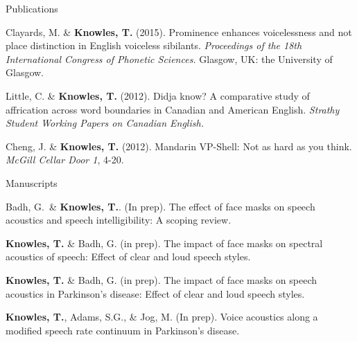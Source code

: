 \documentclass{resume} %
\begin{document}
\begin{rSection}{Publications}
\begin{etaremune}
	\item Clayards, M. \& {\bf Knowles, T.} (2015). Prominence enhances voicelessness and not place distinction in English voiceless sibilants. \emph{Proceedings of the 18th International Congress of Phonetic Sciences.} Glasgow, UK: the University of Glasgow.

	\item Little, C. \& {\bf Knowles, T.} (2012). Didja know? A comparative study of affrication across word boundaries in Canadian and American English. \emph{Strathy Student Working Papers on Canadian English.}

	\item Cheng, J. \& {\bf Knowles, T.} (2012). Mandarin VP-Shell: Not as hard as you think. \emph{McGill Cellar Door 1}, 4-20.

\end{etaremune}

\end{rSection}

\begin{rSection}{Manuscripts}
	
Badh, G.\dagger\ \& {\bf Knowles, T.}. (In prep). The effect of face masks on speech acoustics and speech intelligibility: A scoping review.

{\bf Knowles, T.} \& Badh, G. (in prep). The impact of face masks on spectral acoustics of speech: Effect of clear and loud speech styles.

{\bf Knowles, T.} \& Badh, G. (in prep). The impact of face masks on speech acoustics in Parkinson's disease: Effect of clear and loud speech styles.

{\bf Knowles, T.}, Adams, S.G., \& Jog, M. (In prep). Voice acoustics along a modified speech rate continuum in Parkinson's disease.


\end{rSection}


\end{document}
